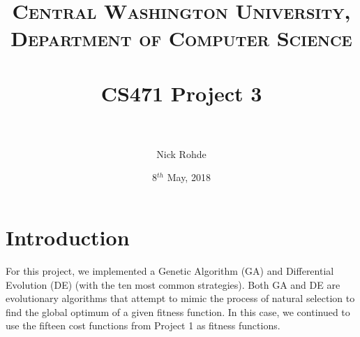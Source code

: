 \documentclass[paper=a4, fontsize=11pt]{scrartcl} %
\title{	
\normalfont \normalsize 
\textsc{Central Washington University, Department of Computer Science} \\ [25pt] %
\horrule{0.5pt} \\[0.4cm] %
\huge CS471 Project 3 \\ %
\horrule{2pt} \\[0.5cm] %
}
\author{Nick Rohde} %
\date{\normalsize 8$^{th}$ May, 2018} %
\numberwithin{equation}{section} %
\numberwithin{figure}{section} %
\numberwithin{table}{section} %
\begin{document}
\maketitle %


\section{Introduction}\label{S1}
	For this project, we implemented a Genetic Algorithm (GA) and Differential Evolution (DE) (with the ten most common strategies). Both GA and DE are evolutionary algorithms that attempt to mimic the process of natural selection to find the global optimum of a given fitness function. In this case, we continued to use the fifteen cost functions from Project 1 as fitness functions. \\
	
\end{document}
